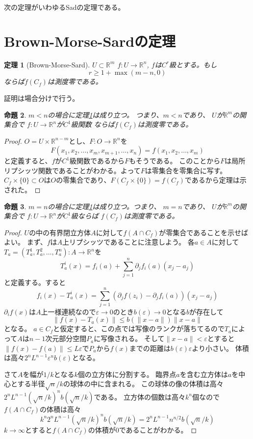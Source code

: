 \documentclass[leqno]{jsarticle}
\newtheorem{thm}{定理}
\newtheorem{prop}[thm]{命題}
\newcommand{\rr}{\mathbb{R}}
\newcommand{\ep}{\varepsilon}
\begin{document}
次の定理がいわゆるSadの定理である。

\section{Brown-Morse-Sardの定理}
\begin{thm}[Brown-Morse-Sard]\label{bms}
$U\subset \rr^m$
$f:U\to \rr^n$, $f$は$C^r$級とする。もし
\[
r\ge 1+ \max({m-n, 0})
\]
ならば$f(C_f)$は測度零である。
\end{thm}
証明は場合分けで行う。
\begin{prop}\label{bms1}
$m<n$の場合に定理\ref{bms}は成り立つ。
つまり、$m<n$であり、
$U$が$\rr^m$の開集合で
$f:U\to \rr^n$が$C^1$級関数
ならば$f(C_f)$は測度零である。
\end{prop}
\begin{proof}
$O=U\times \rr^{n-m}$とし、$F:O\to \rr^n$を
\[
F(x_1,x_2,\dots, x_m, x_{m+1},\dots, x_n)=f(x_1,x_2,\dots, x_m)
\]
と定義すると、$f$が$C^{1}$級関数であるから$F$もそうである。
このことから$F$は局所リプシッツ関数であることがわかる。よって$F$は零集合を零集合に写す。$C_f\times\{0\}\subset O$は$O$の零集合であり、$F(C_f\times\{0\})=f(C_f)$であるから定理は示された。
\end{proof}

\begin{prop}\label{bms2}
$m=n$の場合に定理\ref{bms}は成り立つ。つまり、
$m=n$であり、
$U$が$\rr^m$の開集合で
$f:U\to \rr^n$が$C^1$級ならば
$f(C_f)$は測度零である。
\end{prop}
\begin{proof}
$U$の中の有界閉立方体$A$に対して$f(A\cap C_f)$が零集合であることを示せばよい。
まず、$f$は$A$上リプシッツであることに注意しよう。
各$a\in A$に対して
$T_a=(T_a^1,T_a^2,\dots,T_a^n):A\to \rr^n$を
\[
T_a^i(x)=f_i(a)+\sum_{j=1}^n\partial_j f_i(a)(x_j-a_j)
\]
と定義する。すると
\[
f_i(x)-T_a^i(x)=\sum_{j=1}^n(\partial_jf(z_i)-\partial_j f_i(a))(x_j-a_j)
\]
$\partial_i f(x)$は$A$上一様連続なので$\ep\to 0$のとき$b(\ep)\to 0$となる$b$が存在して
\[
\|f(x)-T_a(x)\|\le b(\|x-a\|)\|x-a\|
\]
となる。
$a\in C_f$と仮定すると、この点では写像のランクが落ちてるので$T_a$によって$A$は$n-1$次元部分空間$P_a$に写像される。
そして$\|x-a\|<\ep$とすると$\|f(x)-f(a)\|\le L\ep$で$P_a$から$f(x)$までの距離は$b(\ep)\ep$より小さい。
体積は高々$2^nL^{n-1}\ep^nb(\ep)$となる。
\par
さて$A$を幅が$1/k$となる$k$個の立方体に分割する。
臨界点$a$を含む立方体は$a$を中心とする半径$\sqrt{n}/k$の球体の中に含まれる。
この球体の像の体積は高々$2^nL^{n-1}(\sqrt{n}/k)^nb(\sqrt{n}/k)$である。
立方体の個数は高々$k^n$個なので$f(A\cap C_f)$の体積は高々
\[
k^n2^nL^{n-1}(\sqrt{n}/k)^nb(\sqrt{n}/k)=2^nL^{n-1}n^{n/2}b(\sqrt{n}/k)
\]
$k\to \infty$とすると$f(A\cap C_f)$の体積が$0$であることがわかる。
\end{proof}
\end{document}
